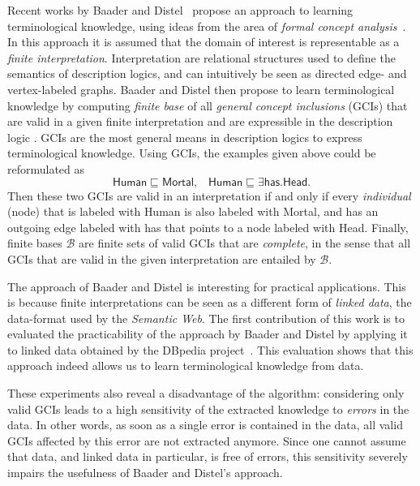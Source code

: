 \documentclass[english,fleqn]{scrartcl}
\begin{document}
Recent works by Baader and Distel~\cite{Diss-Felix} propose an approach to learning
terminological knowledge, using ideas from the area of \emph{formal concept
  analysis}~\cite{fca-book}.  In this approach it is assumed that the domain of interest
is representable as a \emph{finite interpretation}.  Interpretation are relational
structures used to define the semantics of description logics, and can intuitively be seen
as directed edge- and vertex-labeled graphs.  Baader and Distel then propose to learn
terminological knowledge by computing \emph{finite base} of all \emph{general concept
  inclusions} (GCIs) that are valid in a given finite interpretation and are expressible
in the description logic \ELbot.  GCIs are the most general means in description logics to
express terminological knowledge.  Using GCIs, the examples given above could be
reformulated as
\begin{equation*}
  \mathsf{Human} \sqsubseteq \mathsf{Mortal}, \;\;\; \mathsf{Human} \sqsubseteq \exists
  \mathsf{has}. \mathsf{Head}.
\end{equation*}
Then these two GCIs are valid in an interpretation if and only if every \emph{individual}
(node) that is labeled with \textsf{Human} is also labeled with \textsf{Mortal}, and has
an outgoing edge labeled with \textsf{has} that points to a node labeled with
\textsf{Head}.  Finally, finite bases $\mathcal{B}$ are finite sets of valid GCIs that are
\emph{complete}, in the sense that all GCIs that are valid in the given interpretation are
entailed by $\mathcal{B}$.

The approach of Baader and Distel is interesting for practical applications.  This is
because finite interpretations can be seen as a different form of \emph{linked data}, the
data-format used by the \emph{Semantic Web}.  The first contribution of this work is to
evaluated the practicability of the approach by Baader and Distel by applying it to linked
data obtained by the DBpedia project~\cite{DBpedia}.  This evaluation shows that this
approach indeed allows us to learn terminological knowledge from data.

These experiments also reveal a disadvantage of the algorithm: considering only valid GCIs
leads to a high sensitivity of the extracted knowledge to \emph{errors} in the data.  In
other words, as soon as a single error is contained in the data, all valid GCIs affected
by this error are not extracted anymore.  Since one cannot assume that data, and linked
data in particular, is free of errors, this sensitivity severely impairs the usefulness of
Baader and Distel's approach.
\end{document}
